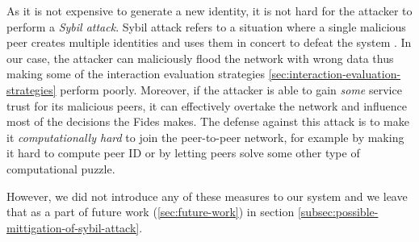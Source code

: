 As it is not expensive to generate a new identity, it is not hard for the attacker to perform a \textit{Sybil attack}.
Sybil attack refers to a situation where a single malicious peer creates multiple identities and uses them in concert to defeat the system \cite{sybil}.
In our case, the attacker can maliciously flood the network with wrong data thus making some of the interaction evaluation strategies \ref{sec:interaction-evaluation-strategies} perform poorly.
Moreover, if the attacker is able to gain \textit{some} service trust for its malicious peers, it can effectively overtake the network and influence most of the decisions the Fides makes.
The defense against this attack is to make it \textit{computationally hard} to join the peer-to-peer network, for example by making it hard to compute peer ID or by letting peers solve some other type of computational puzzle. 

However, we did not introduce any of these measures to our system and we leave that as a part of future work (\ref{sec:future-work}) in section \ref{subsec:possible-mittigation-of-sybil-attack}. 